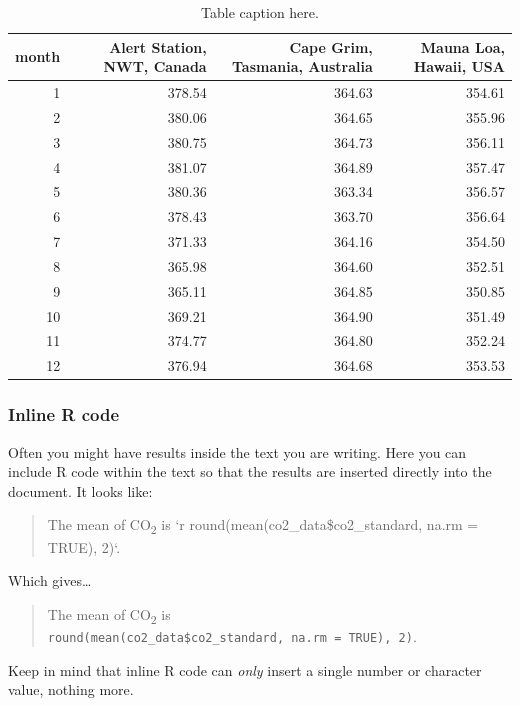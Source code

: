 \documentclass[]{Nemilov}
\begin{document}
\begin{table}

\caption{\label{tab:mean-co2-table}Table caption here.}
\centering
\begin{tabular}[t]{r|r|r|r}
\hline
month & Alert Station, NWT, Canada & Cape Grim, Tasmania, Australia & Mauna Loa, Hawaii, USA\\
\hline
1 & 378.54 & 364.63 & 354.61\\
\hline
2 & 380.06 & 364.65 & 355.96\\
\hline
3 & 380.75 & 364.73 & 356.11\\
\hline
4 & 381.07 & 364.89 & 357.47\\
\hline
5 & 380.36 & 363.34 & 356.57\\
\hline
6 & 378.43 & 363.70 & 356.64\\
\hline
7 & 371.33 & 364.16 & 354.50\\
\hline
8 & 365.98 & 364.60 & 352.51\\
\hline
9 & 365.11 & 364.85 & 350.85\\
\hline
10 & 369.21 & 364.90 & 351.49\\
\hline
11 & 374.77 & 364.80 & 352.24\\
\hline
12 & 376.94 & 364.68 & 353.53\\
\hline
\end{tabular}
\end{table}

\hypertarget{inline-r-code}{%
\subsubsection{Inline R code}\label{inline-r-code}}

Often you might have results inside the text you are writing. Here you can
include R code within the text so that the results are inserted directly
into the document. It looks like:

\begin{quote}
The mean of CO\textsubscript{2} is `r round(mean(co2\_data\$co2\_standard, na.rm = TRUE), 2)`.
\end{quote}

Which gives\ldots{}

\begin{quote}
The mean of CO\textsubscript{2} is \texttt{round(mean(co2\_data\$co2\_standard,\ na.rm\ =\ TRUE),\ 2)}.
\end{quote}

Keep in mind that inline R code can \emph{only} insert a single number or character
value, nothing more.
\end{document}
